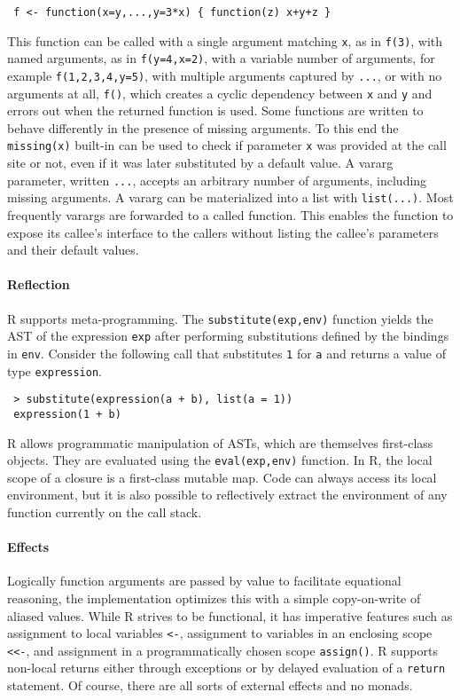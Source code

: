 \documentclass[review,creen,acmsmall]{acmart}
\renewcommand{\c}[1]{\lstinline |#1|\xspace}
\begin{document}
\begin{lstlisting}
 f <- function(x=y,...,y=3*x) { function(z) x+y+z }
\end{lstlisting}


This function can be called with a single argument matching \c x, as in
\c{f(3)}, with named arguments, as in \c{f(y=4,x=2)}, with a variable number of
arguments, for example \c{f(1,2,3,4,y=5)}, with multiple arguments captured by
\c{...}, or with no arguments at all, \c{f()}, which creates a cyclic dependency
between \c x and \c y and errors out when the returned function is used. Some
functions are written to behave differently in the presence of missing
arguments. To this end the \c{missing(x)} built-in can be used to check if
parameter \c{x} was provided at the call site or not, even if it was later
substituted by a default value. A vararg parameter, written \c{...}, accepts an
arbitrary number of arguments, including missing arguments. A vararg can be
materialized into a list with \c{list(...)}. Most frequently varargs are
forwarded to a called function. This enables the function to expose its callee's
interface to the callers without listing the callee's parameters and their
default values.

\paragraph{Reflection}
R supports meta-programming. The \c{substitute(exp,env)} function yields the AST
of the expression \c{exp} after performing substitutions defined by the bindings
in \c{env}. Consider the following call that substitutes \c 1 for \c a and
returns a value of type \c{expression}.

\begin{lstlisting}
 > substitute(expression(a + b), list(a = 1))
 expression(1 + b)
\end{lstlisting}

R allows programmatic manipulation of ASTs, which are themselves
first-class objects. They are evaluated using the \c{eval(exp,env)} function.
In R, the local scope of a closure is a first-class mutable map. Code can always
access its local environment, but it is also possible to reflectively extract
the environment of any function currently on the call stack.

\paragraph{Effects} Logically function arguments are passed by value to
facilitate equational reasoning, the implementation optimizes this with a simple
copy-on-write of aliased values. While R strives to be functional, it has
imperative features such as assignment to local variables \c{<-}, assignment
to variables in an enclosing scope \c{<<-}, and assignment in a
programmatically chosen scope \c{assign()}. R supports non-local returns
either through exceptions or by delayed evaluation of a \c{return} statement.
Of course, there are all sorts of external effects and no monads.
\end{document}
